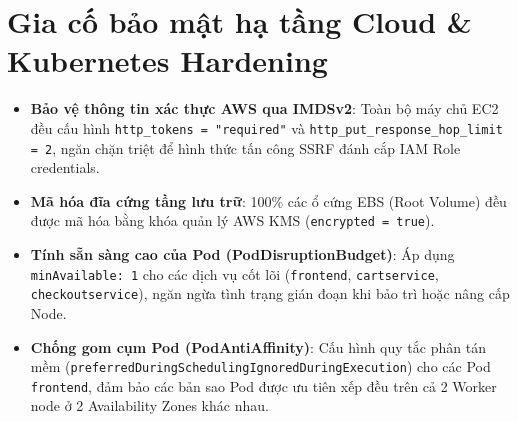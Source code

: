 \section{Gia cố bảo mật hạ tầng Cloud \& Kubernetes Hardening}
\begin{itemize}
    \item \textbf{Bảo vệ thông tin xác thực AWS qua IMDSv2}: Toàn bộ máy chủ EC2 đều cấu hình \texttt{http\_tokens = "required"} và \texttt{http\_put\_response\_hop\_limit = 2}, ngăn chặn triệt để hình thức tấn công SSRF đánh cắp IAM Role credentials.
    \item \textbf{Mã hóa đĩa cứng tầng lưu trữ}: 100\% các ổ cứng EBS (Root Volume) đều được mã hóa bằng khóa quản lý AWS KMS (\texttt{encrypted = true}).
    \item \textbf{Tính sẵn sàng cao của Pod (PodDisruptionBudget)}: Áp dụng \texttt{minAvailable: 1} cho các dịch vụ cốt lõi (\texttt{frontend}, \texttt{cartservice}, \texttt{checkoutservice}), ngăn ngừa tình trạng gián đoạn khi bảo trì hoặc nâng cấp Node.
    \item \textbf{Chống gom cụm Pod (PodAntiAffinity)}: Cấu hình quy tắc phân tán mềm (\texttt{preferredDuringSchedulingIgnoredDuringExecution}) cho các Pod \texttt{frontend}, đảm bảo các bản sao Pod được ưu tiên xếp đều trên cả 2 Worker node ở 2 Availability Zones khác nhau.
\end{itemize}
